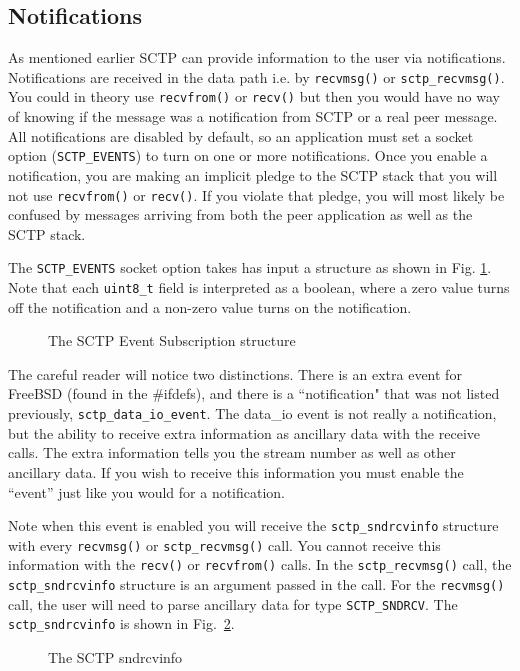 \documentclass[conference]{IEEEtran}
\begin{document}
\subsection{Notifications}

As mentioned earlier SCTP can provide information to the user via
notifications. Notifications are received in the data path i.e. by \texttt{recvmsg()} or \texttt{sctp\_recvmsg()}. You could in theory use \texttt{recvfrom()} or \texttt{recv()} but then you would have no way of knowing if
the message was a notification from SCTP or a real peer message.  All notifications are disabled by default, so
an application must set a socket option (\texttt{SCTP\_EVENTS}) to turn on one or more notifications. Once you 
enable a notification, you are making an implicit pledge to the SCTP stack that you will not use \texttt{recvfrom()} or \texttt{recv()}.
If you violate that pledge, you will most likely be confused by messages arriving from both the peer application as well as the SCTP stack.

The \texttt{SCTP\_EVENTS} socket option takes has input a structure as shown
in Fig. \ref{fig:events}. Note that each \texttt{uint8\_t} field
is interpreted as a boolean, where a zero value turns off the 
notification and a non-zero value turns on the notification.
\begin{figure}

\caption{The SCTP Event Subscription structure}
\label{fig:events}
\end{figure}

The careful reader will notice two distinctions. There is an extra event
for FreeBSD (found in the \#ifdefs), and there is a ``notification" that was 
not listed previously, \texttt{sctp\_data\_io\_event}. The data\_io event is not really a 
notification, but the ability to receive extra information as ancillary data with the receive calls.
The extra information tells you the stream number as well as other
ancillary data. If you wish to receive this information you must enable
the ``event'' just like you would for a notification. 

Note when this event is enabled you will receive the \texttt{sctp\_sndrcvinfo}
structure with every 
\texttt{recvmsg()} or \texttt{sctp\_recvmsg()} call. You cannot receive
this information with the \texttt{recv()} or \texttt{recvfrom()} calls. In the
\texttt{sctp\_recvmsg()} call, the \texttt{sctp\_sndrcvinfo}  structure is an
argument passed in the call. For the \texttt{recvmsg()} call, the user will
need to parse ancillary data for type \texttt{SCTP\_SNDRCV}. 
The \texttt{sctp\_sndrcvinfo} is shown in Fig.~\ref{fig:sndrcv}.
\begin{figure}

\caption{The SCTP sndrcvinfo}
\label{fig:sndrcv}
\end{figure}
\end{document}
